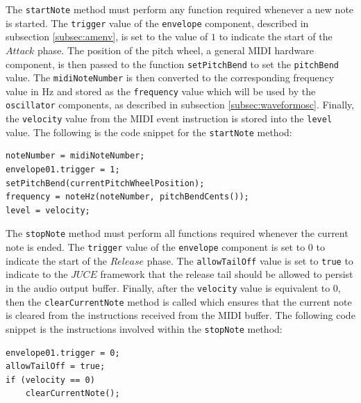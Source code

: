 \documentclass[a4paper,12pt]{report}
\begin{document}
The \texttt{start\-Note} method must perform any function required whenever a new note is started. The \texttt{trigger} value of the \texttt{envelope} component, described in subsection \ref{subsec:amenv}, is set to the value of $1$ to indicate the start of the $Attack$ phase. The position of the pitch wheel, a general MIDI hardware component, is then passed to the function \texttt{set\-Pitch\-Bend} to set the \texttt{pitch\-Bend} value. The \texttt{midi\-Note\-Number} is then converted to the corresponding frequency value in Hz and stored as the \texttt{frequency} value which will be used by the \texttt{oscillator} components, as described in subsection \ref{subsec:waveformosc}. Finally, the \texttt{velocity} value from the MIDI event instruction is stored into the \texttt{level} value. The following is the code snippet for the \texttt{start\-Note} method:

 \noindent\begin{minipage}{\linewidth} \begin{lstlisting}[caption={\texttt{startNote()}},label={code:startnote},captionpos=b]
noteNumber = midiNoteNumber;
envelope01.trigger = 1;
setPitchBend(currentPitchWheelPosition);
frequency = noteHz(noteNumber, pitchBendCents());
level = velocity;
\end{lstlisting} \end{minipage}

The \texttt{stop\-Note} method must perform all functions required whenever the current note is ended. The \texttt{trigger} value of the \texttt{envelope} component is set to $0$ to indicate the start of the $Release$ phase. The \texttt{allow\-Tail\-Off} value is set to \texttt{true} to indicate to the $JUCE$ framework that the release tail should be allowed to persist in the audio output buffer. Finally, after the \texttt{velocity} value is equivalent to $0$, then the \texttt{clear\-Current\-Note} method is called which ensures that the current note is cleared from the instructions received from the MIDI buffer. The following code snippet is the instructions involved within the \texttt{stop\-Note} method:

 \noindent\begin{minipage}{\linewidth} \begin{lstlisting}[caption={\texttt{stopNote()}},label={code:stopnote},captionpos=b]
envelope01.trigger = 0;
allowTailOff = true;
if (velocity == 0)
    clearCurrentNote();
\end{lstlisting} \end{minipage}
\end{document}
